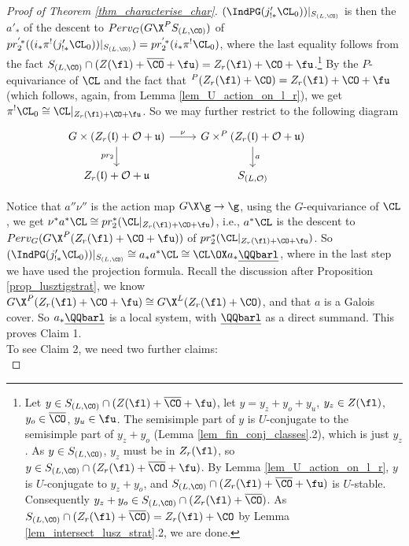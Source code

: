 \begin{proof}[Proof of Theorem \ref{thm_characterise_char}]
$(\IndPG(j'_{!*}\CL_0))|_{S_{(L,\CO)}}$ is then the $a'_*$ of the descent to $Perv_G(G\X^P S_{(L,\CO)})$ of $pr_2^{'*}((i_*\pi^!(j'_{!*}\CL_0))|_{S_{(L,\CO)}})=pr_2^{'*}(i_*\pi^!\CL_0)$, where the last equality follows from the fact $S_{(L,\CO)}\cap (Z(\fl)+\overline{\CO}+\fu)=Z_r(\fl)+\CO+\fu$.\footnote{Let $y\in S_{(L,\CO)}\cap (Z(\fl)+\overline{\CO}+\fu)$, let $y=y_z+y_o+y_u$, $y_z\in Z(\fl)$, $y_o\in\overline{\CO}$, $y_u\in \fu$. The semisimple part of $y$ is $U$-conjugate to the semisimple part of $y_z+y_o$ (Lemma \ref{lem_fin_conj_classes}.2), which is just $y_z$. As $y\in S_{(L,\CO)}$, $y_z$ must be in $Z_r(\fl)$, so $y\in S_{(L,\CO)}\cap(Z_r(\fl)+\overline{\CO}+\fu)$. By Lemma \ref{lem_U_action_on_l_r}, $y$ is $U$-conjugate to $y_z+y_o$, and $S_{(L,\CO)}\cap(Z_r(\fl)+\overline{\CO}+\fu)$ is $U$-stable. Consequently $y_z+y_o\in S_{(L,\CO)}\cap (Z_r(\fl)+\overline{\CO})$. As $S_{(L,\CO)}\cap (Z_r(\fl)+\overline{\CO})=Z_r(\fl)+\CO$ by Lemma \ref{lem_intersect_lusz_strat}.2, we are done.} By the $P$-equivariance of $\CL$ and the fact that $^P(Z_r(\fl)+\CO)=Z_r(\fl)+\CO+\fu$ (which follows, again, from Lemma \ref{lem_U_action_on_l_r}), we get $\pi^!\CL_0\cong\CL|_{Z_r(\fl)+\CO+\fu}$. So we may further restrict to the following diagram
\[\begin{tikzcd}
	{G\times (Z_r(\mathfrak{l})+\mathcal{O}+\mathfrak{u})} & {G\times^P(Z_r(\mathfrak{l})+\mathcal{O}+\mathfrak{u})} \\
	{Z_r(\mathfrak{l})+\mathcal{O}+\mathfrak{u}} & {S_{(L,\mathcal{O})}} & {}
	\arrow["{pr_2}"', from=1-1, to=2-1]
	\arrow["\nu", from=1-1, to=1-2]
	\arrow["a", from=1-2, to=2-2]
\end{tikzcd}\]

Notice that $a''\nu''$ is the action map $G\X\g\rightarrow \g$, using the $G$-equivariance of $\CL$, we get $\nu^*a^*\CL\cong pr_2^*(\CL|_{Z_r(\fl)+\CO+\fu})$, i.e., $a^*\CL$ is the descent to $Perv_G(G\X^P (Z_r(\fl)+\CO+\fu))$ of $pr_2^*(\CL|_{Z_r(\fl)+\CO+\fu})$. So $(\IndPG(j'_{!*}\CL_0))|_{S_{(L,\CO)}}\cong a_*a^*\CL\cong \CL\OX a_*\underline{\QQbarl}$, where in the last step we have used the projection formula. Recall the discussion after Proposition \ref{prop_lusztigstrat}, we know $G\X^P(Z_r(\fl)+\CO+\fu)\cong G\X^L(Z_r(\fl)+\CO)$, and that $a$ is a Galois cover. So $a_*\underline{\QQbarl}$ is a local system, with $\underline{\QQbarl}$ as a direct summand. This proves Claim 1.\\

To see Claim 2, we need two further claims:\\


\end{proof}
